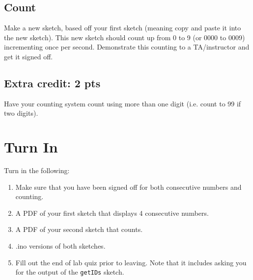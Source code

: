 \subsection{Count}
Make a new sketch, based off your first sketch (meaning copy and paste it into the new sketch).
This new sketch should count up from 0 to 9 (or 0000 to 0009) incrementing once per second. Demonstrate
this counting to a TA/instructor and get it signed off.

\subsection{Extra credit: 2 pts}
Have your counting system count using more than one digit (i.e. count to 99 if two digits).

\section{Turn In}
Turn in the following:
\begin{enumerate}
    \item Make sure that you have been signed off for both consecutive numbers and counting.
    \item A PDF of your first sketch that displays 4 consecutive numbers.
    \item A PDF of your second sketch that counts.
    \item .ino versions of both sketches.
    \item Fill out the end of lab quiz prior to leaving. Note that it includes asking you 
            for the output of the \lstinline$getIDs$ sketch. 
\end{enumerate}